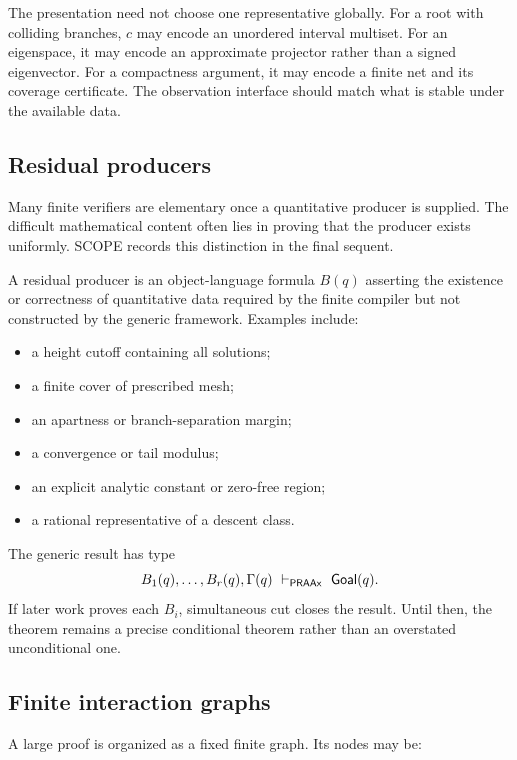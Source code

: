 The presentation need not choose one representative globally.  For a root with colliding branches, \(c\) may encode an unordered interval multiset.  For an eigenspace, it may encode an approximate projector rather than a signed eigenvector.  For a compactness argument, it may encode a finite net and its coverage certificate.  The observation interface should match what is stable under the available data.

\subsection{Residual producers}

Many finite verifiers are elementary once a quantitative producer is supplied.  The difficult mathematical content often lies in proving that the producer exists uniformly.  SCOPE records this distinction in the final sequent.

\begin{definition}
A residual producer is an object-language formula \(B(q)\) asserting the existence or correctness of quantitative data required by the finite compiler but not constructed by the generic framework.  Examples include:
\begin{itemize}
\item a height cutoff containing all solutions;
\item a finite cover of prescribed mesh;
\item an apartness or branch-separation margin;
\item a convergence or tail modulus;
\item an explicit analytic constant or zero-free region;
\item a rational representative of a descent class.
\end{itemize}
\end{definition}

The generic result has type
\[
  B_1(q),\ldots,B_r(q),\Gamma(q)\ \vdash_{\PRAAx}\ \Goal(q).
\]
If later work proves each \(B_i\), simultaneous cut closes the result.  Until then, the theorem remains a precise conditional theorem rather than an overstated unconditional one.

\subsection{Finite interaction graphs}

A large proof is organized as a fixed finite graph.  Its nodes may be:

